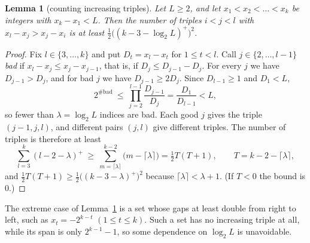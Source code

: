\documentclass[11pt,a4paper]{article}
\newtheorem{lemma}[theorem]{Lemma}
\theoremstyle{definition}
\begin{document}
\begin{lemma}[counting increasing triples]\label{lem:count}
Let $L\ge2$, and let $x_1<x_2<\dots<x_k$ be integers with $x_k-x_1<L$. Then the number of triples $i<j<l$ with $x_l-x_j>x_j-x_i$ is at least $\tfrac12\bigl((k-3-\log_2L)^+\bigr)^2$.
\end{lemma}
\begin{proof}
Fix $l\in\{3,\dots,k\}$ and put $D_t=x_l-x_t$ for $1\le t<l$. Call $j\in\{2,\dots,l-1\}$ \emph{bad} if $x_l-x_j\le x_j-x_{j-1}$, that is, if $D_j\le D_{j-1}-D_j$. For every $j$ we have $D_{j-1}>D_j$, and for bad $j$ we have $D_{j-1}\ge2D_j$. Since $D_{l-1}\ge1$ and $D_1<L$,
\[
2^{\#\text{bad}}\ \le\ \prod_{j=2}^{l-1}\frac{D_{j-1}}{D_j}=\frac{D_1}{D_{l-1}}<L ,
\]
so fewer than $\lambda=\log_2L$ indices are bad. Each good $j$ gives the triple $(j-1,j,l)$, and different pairs $(j,l)$ give different triples. The number of triples is therefore at least
\[
\sum_{l=3}^{k}(l-2-\lambda)^+\ \ge\ \sum_{m=\lceil\lambda\rceil}^{k-2}\bigl(m-\lceil\lambda\rceil\bigr)=\tfrac12 T(T+1),\qquad T=k-2-\lceil\lambda\rceil ,
\]
and $\tfrac12T(T+1)\ge\tfrac12\bigl((k-3-\lambda)^+\bigr)^2$ because $\lceil\lambda\rceil<\lambda+1$. (If $T<0$ the bound is $0$.)
\end{proof}

The extreme case of Lemma~\ref{lem:count} is a set whose gaps at least double from right to left, such as $x_t=-2^{k-t}$ $(1\le t\le k)$. Such a set has no increasing triple at all, while its span is only $2^{k-1}-1$, so some dependence on $\log_2 L$ is unavoidable.
\end{document}
